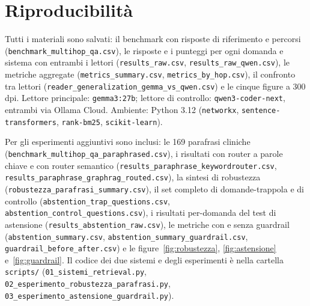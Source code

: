 \documentclass[11pt,a4paper]{report}
\begin{document}
\section{Riproducibilità}

Tutti i materiali sono salvati: il benchmark con risposte di riferimento e
percorsi (\texttt{benchmark\_multihop\_qa.csv}), le risposte e i punteggi
per ogni domanda e sistema con entrambi i lettori
(\texttt{results\_raw.csv}, \texttt{results\_raw\_qwen.csv}), le metriche
aggregate (\texttt{metrics\_summary.csv}, \texttt{metrics\_by\_hop.csv}), il
confronto tra lettori (\texttt{reader\_generalization\_gemma\_vs\_qwen.csv})
e le cinque figure a 300 dpi. Lettore principale: \texttt{gemma3:27b};
lettore di controllo: \texttt{qwen3-coder-next}, entrambi via Ollama Cloud.
Ambiente: Python 3.12 (\texttt{networkx}, \texttt{sentence-transformers},
\texttt{rank-bm25}, \texttt{scikit-learn}).

Per gli esperimenti aggiuntivi sono inclusi: le 169 parafrasi cliniche
(\texttt{benchmark\_multihop\_qa\_paraphrased.csv}), i risultati con router a
parole chiave e con router semantico
(\texttt{results\_paraphrase\_keywordrouter.csv},
\texttt{results\_paraphrase\_graphrag\_routed.csv}), la sintesi di robustezza
(\texttt{robustezza\_parafrasi\_summary.csv}), il set completo di
domande-trappola e di controllo
(\texttt{abstention\_trap\_questions.csv},
\texttt{abstention\_control\_questions.csv}), i risultati per-domanda del test
di astensione (\texttt{results\_abstention\_raw.csv}), le metriche con e senza
guardrail (\texttt{abstention\_summary.csv},
\texttt{abstention\_summary\_guardrail.csv},
\texttt{guardrail\_before\_after.csv}) e le figure~\ref{fig:robustezza},
\ref{fig:astensione} e~\ref{fig:guardrail}. Il codice dei due sistemi e degli
esperimenti è nella cartella \texttt{scripts/}
(\texttt{01\_sistemi\_retrieval.py}, \texttt{02\_esperimento\_robustezza\_parafrasi.py},
\texttt{03\_esperimento\_astensione\_guardrail.py}).
\end{document}
